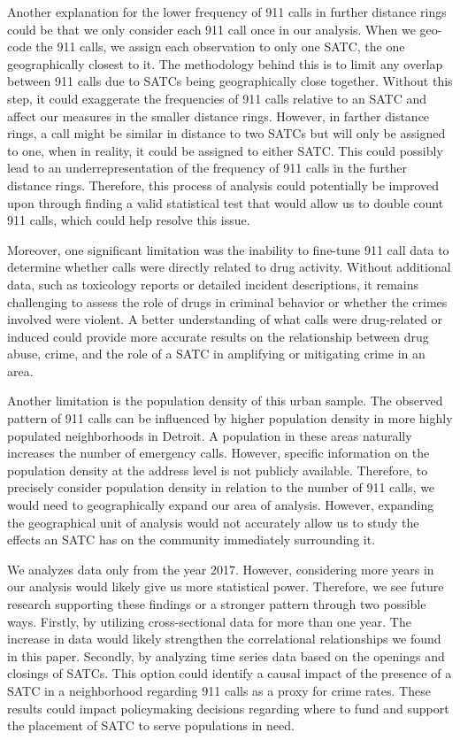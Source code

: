 \documentclass[12pt]{article}
\begin{document}
Another explanation for the lower frequency of 911 calls in further distance rings could be that we only consider each 911 call once in our analysis. When we geo-code the 911 calls, we assign each observation to only one SATC, the one geographically closest to it. The methodology behind this is to limit any overlap between 911 calls due to SATCs being geographically close together. Without this step, it could exaggerate the frequencies of 911 calls relative to an SATC and affect our measures in the smaller distance rings.  However, in farther distance rings, a call might be similar in distance to two SATCs but will only be assigned to one, when in reality, it could be assigned to either SATC. This could possibly lead to an underrepresentation of the frequency of 911 calls in the further distance rings. Therefore, this process of analysis could potentially be improved upon through finding a valid statistical test that would allow us to double count 911 calls, which could help resolve this issue. 

Moreover, one significant limitation was the inability to fine-tune 911 call data to determine whether calls were directly related to drug activity. Without additional data, such as toxicology reports or detailed incident descriptions, it remains challenging to assess the role of drugs in criminal behavior or whether the crimes involved were violent. A better understanding of what calls were drug-related or induced could provide more accurate results on the relationship between drug abuse, crime, and the role of a SATC in amplifying or mitigating crime in an area. 
    
Another limitation is the population density of this urban sample. The observed pattern of 911 calls can be influenced by higher population density in more highly populated neighborhoods in Detroit. A population in these areas naturally increases the number of emergency calls. However, specific information on the population density at the address level is not publicly available. Therefore, to precisely consider population density in relation to the number of 911 calls, we would need to geographically expand our area of analysis. However, expanding the geographical unit of analysis would not accurately allow us to study the effects an SATC has on the community immediately surrounding it. 

We analyzes data only from the year 2017. However, considering more years in our analysis would likely give us more statistical power. Therefore, we see future research supporting these findings or a stronger pattern through two possible ways. Firstly, by utilizing cross-sectional data for more than one year. The increase in data would likely strengthen the correlational relationships we found in this paper. Secondly, by analyzing time series data based on the openings and closings of SATCs. This option could identify a causal impact of the presence of a SATC in a neighborhood regarding 911 calls as a proxy for crime rates. These results could impact policymaking decisions regarding where to fund and support the placement of SATC to serve populations in need. 
\end{document}
